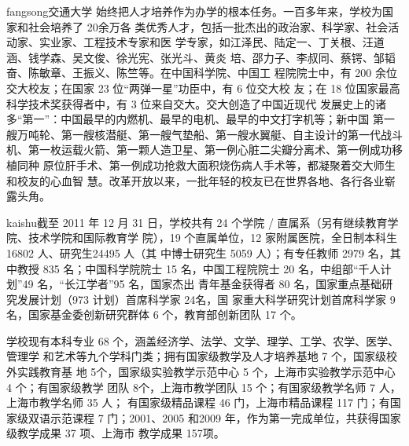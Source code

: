 {\ifcsname fangsong\endcsname\fangsong\else[无 \cs{fangsong} 字体。]\fi 交通大学
  始终把人才培养作为办学的根本任务。一百多年来，学校为国家和社会培养了 20余万各
  类优秀人才，包括一批杰出的政治家、科学家、社会活动家、实业家、工程技术专家和医
  学专家，如江泽民、陆定一、丁关根、汪道涵、钱学森、吴文俊、徐光宪、张光斗、黄炎
  培、邵力子、李叔同、蔡锷、邹韬奋、陈敏章、王振义、陈竺等。在中国科学院、中国工
  程院院士中，有 200 余位交大校友；在国家 23 位“两弹一星”功臣中，有 6 位交大校
  友；在 18 位国家最高科学技术奖获得者中，有 3 位来自交大。交大创造了中国近现代
  发展史上的诸多“第一”：中国最早的内燃机、最早的电机、最早的中文打字机等；新中国
  第一艘万吨轮、第一艘核潜艇、第一艘气垫船、第一艘水翼艇、自主设计的第一代战斗
  机、第一枚运载火箭、第一颗人造卫星、第一例心脏二尖瓣分离术、第一例成功移植同种
  原位肝手术、第一例成功抢救大面积烧伤病人手术等，都凝聚着交大师生和校友的心血智
  慧。改革开放以来，一批年轻的校友已在世界各地、各行各业崭露头角。}

{\ifcsname kaishu\endcsname\kaishu\else[无 \cs{kaishu} 字体。]\fi 截至 2011 年 12
  月 31 日，学校共有 24 个学院 / 直属系（另有继续教育学院、技术学院和国际教育学
  院），19 个直属单位，12 家附属医院，全日制本科生 16802 人、研究生24495 人（其
  中博士研究生 5059 人）；有专任教师 2979 名，其中教授 835 名；中国科学院院士 15
  名，中国工程院院士 20 名，中组部“千人计划”49 名，“长江学者”95 名，国家杰出
  青年基金获得者 80 名，国家重点基础研究发展计划（973 计划）首席科学家 24名，国
  家重大科学研究计划首席科学家 9名，国家基金委创新研究群体 6 个，教育部创新团队
  17 个。
  
  学校现有本科专业 68 个，涵盖经济学、法学、文学、理学、工学、农学、医学、管理学
  和艺术等九个学科门类；拥有国家级教学及人才培养基地 7 个，国家级校外实践教育基
  地 5个，国家级实验教学示范中心 5 个，上海市实验教学示范中心 4 个；有国家级教学
  团队 8个，上海市教学团队 15 个；有国家级教学名师 7 人，上海市教学名师 35 人；
  有国家级精品课程 46 门，上海市精品课程 117 门；有国家级双语示范课程 7
  门；2001、2005 和2009 年，作为第一完成单位，共获得国家级教学成果 37 项、上海市
  教学成果 157项。}
